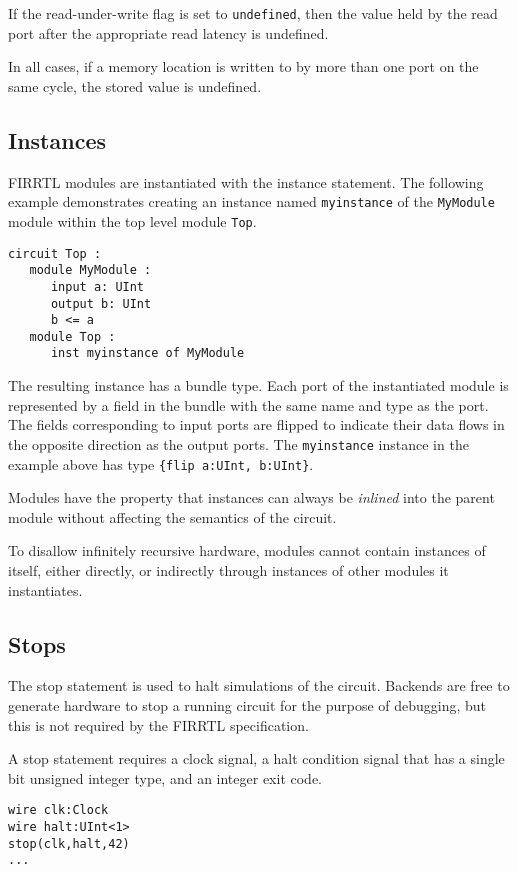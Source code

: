 \documentclass[12pt]{article}
\begin{document}
If the read-under-write flag is set to \verb|undefined|, then the value held by the read port after the appropriate read latency is undefined.

In all cases, if a memory location is written to by more than one port on the same cycle, the stored value is undefined.

\subsection{Instances}\label{instances}
FIRRTL modules are instantiated with the instance statement. The following example demonstrates creating an instance named \verb|myinstance| of the \verb|MyModule| module within the top level module \verb|Top|. 

\begin{verbatim}
circuit Top :
   module MyModule :
      input a: UInt
      output b: UInt
      b <= a
   module Top :
      inst myinstance of MyModule   
\end{verbatim}

The resulting instance has a bundle type. Each port of the instantiated module is represented by a field in the bundle with the same name and type as the port. The fields corresponding to input ports are flipped to indicate their data flows in the opposite direction as the output ports. The \verb|myinstance| instance in the example above has type \verb|{flip a:UInt, b:UInt}|.

Modules have the property that instances can always be {\em inlined} into the parent module without affecting the semantics of the circuit.

To disallow infinitely recursive hardware, modules cannot contain instances of itself, either directly, or indirectly through instances of other modules it instantiates. 

\subsection{Stops}
The stop statement is used to halt simulations of the circuit. Backends are free to generate hardware to stop a running circuit for the purpose of debugging, but this is not required by the FIRRTL specification.

A stop statement requires a clock signal, a halt condition signal that has a single bit unsigned integer type, and an integer exit code.

\begin{verbatim}
wire clk:Clock
wire halt:UInt<1>
stop(clk,halt,42)
...
\end{verbatim}
\end{document}
